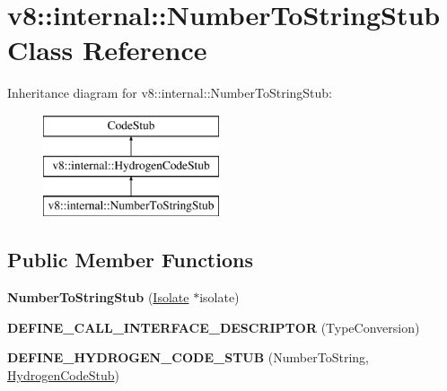 \hypertarget{classv8_1_1internal_1_1_number_to_string_stub}{}\section{v8\+:\+:internal\+:\+:Number\+To\+String\+Stub Class Reference}
\label{classv8_1_1internal_1_1_number_to_string_stub}
Inheritance diagram for v8\+:\+:internal\+:\+:Number\+To\+String\+Stub\+:\begin{figure}[H]
\begin{center}
\leavevmode
\includegraphics[height=3.000000cm]{classv8_1_1internal_1_1_number_to_string_stub}
\end{center}
\end{figure}
\subsection*{Public Member Functions}
\begin{DoxyCompactItemize}
\item 
{\bfseries Number\+To\+String\+Stub} (\hyperlink{classv8_1_1internal_1_1_isolate}{Isolate} $\ast$isolate)\hypertarget{classv8_1_1internal_1_1_number_to_string_stub_ad4c259e9e25cedfa3a601fd0e469db21}{}\label{classv8_1_1internal_1_1_number_to_string_stub_ad4c259e9e25cedfa3a601fd0e469db21}

\item 
{\bfseries D\+E\+F\+I\+N\+E\+\_\+\+C\+A\+L\+L\+\_\+\+I\+N\+T\+E\+R\+F\+A\+C\+E\+\_\+\+D\+E\+S\+C\+R\+I\+P\+T\+OR} (Type\+Conversion)\hypertarget{classv8_1_1internal_1_1_number_to_string_stub_a3d18249c1f80ec774da81d84886810af}{}\label{classv8_1_1internal_1_1_number_to_string_stub_a3d18249c1f80ec774da81d84886810af}

\item 
{\bfseries D\+E\+F\+I\+N\+E\+\_\+\+H\+Y\+D\+R\+O\+G\+E\+N\+\_\+\+C\+O\+D\+E\+\_\+\+S\+T\+UB} (Number\+To\+String, \hyperlink{classv8_1_1internal_1_1_hydrogen_code_stub}{Hydrogen\+Code\+Stub})\hypertarget{classv8_1_1internal_1_1_number_to_string_stub_a58b64c8f9c668a3dbf30872160a6620c}{}\label{classv8_1_1internal_1_1_number_to_string_stub_a58b64c8f9c668a3dbf30872160a6620c}

\end{DoxyCompactItemize}
